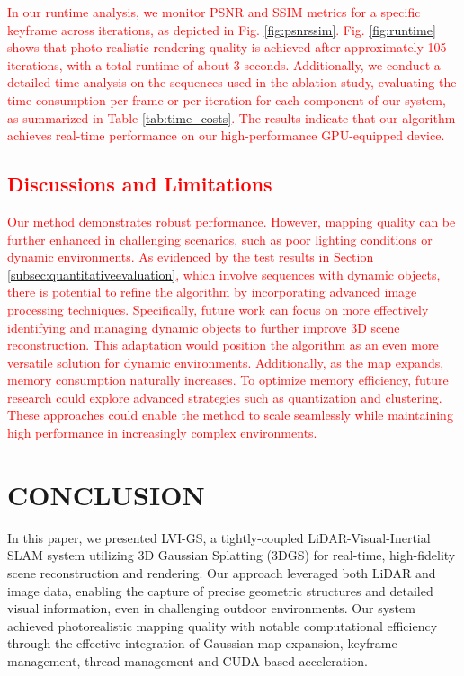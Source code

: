 \documentclass[lettersize,journal]{IEEEtran}
\begin{document}
\textcolor{red}{In our runtime analysis, we monitor PSNR and SSIM metrics for a specific keyframe across iterations, as depicted in Fig. \ref{fig:psnrssim}. Fig. \ref{fig:runtime} shows that photo-realistic rendering quality is achieved after approximately 105 iterations, with a total runtime of about 3 seconds. Additionally, we conduct a detailed time analysis on the sequences used in the ablation study, evaluating the time consumption per frame or per iteration for each component of our system, as summarized in Table \ref{tab:time_costs}. The results indicate that our algorithm achieves real-time performance on our high-performance GPU-equipped device.}

\subsection{\textcolor{red}{Discussions and Limitations}}

\textcolor{red}{Our method demonstrates robust performance. However, mapping quality can be further enhanced in challenging scenarios, such as poor lighting conditions or dynamic environments. As evidenced by the test results in Section \ref{subsec:quantitativeevaluation}, which involve sequences with dynamic objects, there is potential to refine the algorithm by incorporating advanced image processing techniques. Specifically, future work can focus on more effectively identifying and managing dynamic objects to further improve 3D scene reconstruction. This adaptation would position the algorithm as an even more versatile solution for dynamic environments. Additionally, as the map expands, memory consumption naturally increases. To optimize memory efficiency, future research could explore advanced strategies such as quantization and clustering. These approaches could enable the method to scale seamlessly while maintaining high performance in increasingly complex environments.}

\section{CONCLUSION}
In this paper, we presented LVI-GS, a tightly-coupled LiDAR-Visual-Inertial SLAM system utilizing 3D Gaussian Splatting (3DGS) for real-time, high-fidelity scene reconstruction and rendering. Our approach leveraged both LiDAR and image data, enabling the capture of precise geometric structures and detailed visual information, even in challenging outdoor environments. Our system achieved photorealistic mapping quality with notable computational efficiency through the effective integration of Gaussian map expansion, keyframe management, thread management and CUDA-based acceleration.
\end{document}
